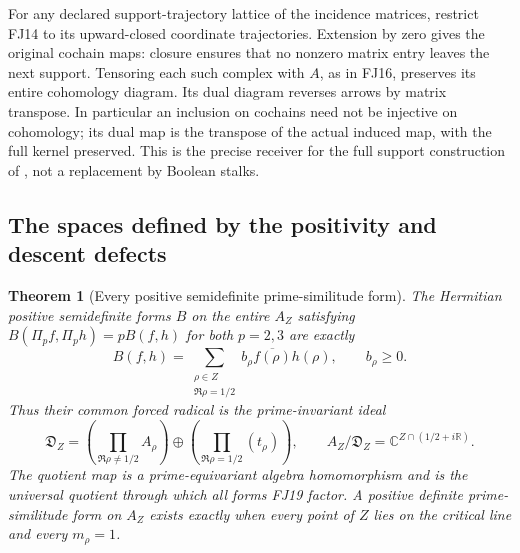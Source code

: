 \documentclass[11pt,a4paper]{article}
\newtheorem{theorem}{Theorem}[section]
\theoremstyle{definition}\newtheorem{definition}[theorem]{Definition}
\newcommand{\C}{\mathbb C}\newcommand{\R}{\mathbb R}
\begin{document}
For any declared support-trajectory lattice of the incidence matrices,
restrict FJ14 to its upward-closed coordinate trajectories. Extension
by zero gives the original cochain maps: closure ensures that no
nonzero matrix entry leaves the next support. Tensoring each such
complex with $A$, as in FJ16, preserves its entire cohomology diagram.
Its dual diagram reverses arrows by matrix transpose. In particular
an inclusion on cochains need not be injective on cohomology; its
dual map is the transpose of the actual induced map, with the full
kernel preserved. This is the precise receiver for the full support
construction of \cite{FJsupport}, not a replacement by Boolean stalks.

\subsection{The spaces defined by the positivity and descent defects}
\begin{theorem}[Every positive semidefinite prime-similitude form]
\label{fj:thm:psd}
The Hermitian positive semidefinite forms $B$ on the entire $A_Z$
satisfying $B(\Pi_pf,\Pi_ph)=pB(f,h)$ for both $p=2,3$ are exactly
\[
 B(f,h)=\sum_{\substack{\rho\in Z\\\Re\rho=1/2}}
             b_\rho\overline{f(\rho)}h(\rho),\qquad b_\rho\ge0.
 \tag{FJ19}\label{fj:fj:psd}
\]
Thus their common forced radical is the prime-invariant ideal
\[
 \mathfrak D_Z=
 \left(\prod_{\Re\rho\ne1/2}A_\rho\right)
 \oplus\left(\prod_{\Re\rho=1/2}(t_\rho)\right),
 \qquad A_Z/\mathfrak D_Z=\C^{Z\cap(1/2+i\mathbb R)}.
 \tag{FJ20}\label{fj:fj:defect}
\]
The quotient map is a prime-equivariant algebra homomorphism and is
the universal quotient through which all forms FJ19 factor. A positive
definite prime-similitude form on $A_Z$ exists exactly when every point
of $Z$ lies on the critical line and every $m_\rho=1$.
\end{theorem}
\end{document}
